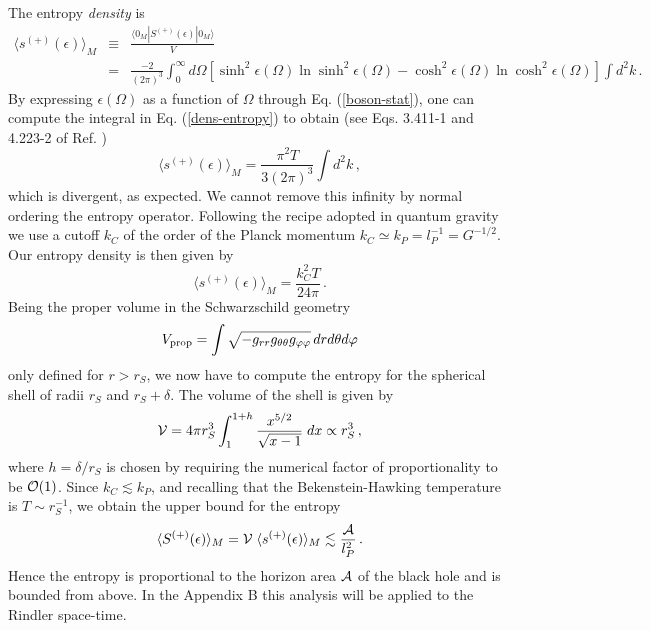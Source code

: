 \noindent The entropy {\it density} is
\begin{eqnarray}\label{dens-entropy}
\langle s^{(+)}(\epsilon)\rangle_M &\equiv&
 \frac{\langle 0_M|S^{(+)}(\epsilon)|0_M\rangle}{V} \\
 &=& \frac{-2}{(2\pi)^3}\int_0^{\infty}d \Omega \left[\sinh^2 \epsilon(\Omega)
\ln \sinh^2\epsilon(\Omega) - \cosh^2 \epsilon(\Omega)\ln
 \cosh^2\epsilon(\Omega)\right]\int d^2 k \,{.} \nonumber
 \end{eqnarray}
By expressing $\epsilon(\Omega)$ as a function of $\Omega$ through
Eq. (\ref{boson-stat}), one can compute the integral in  Eq.
(\ref{dens-entropy}) to obtain (see Eqs. 3.411-1 and 4.223-2 of
Ref. \cite{ryzhik})
\begin{equation}\label{dens-entr-int}
 \langle s^{(+)}(\epsilon)\rangle_M
 = \frac{\pi^2 T}{3(2\pi)^3}  \int d^2 k \,{,}
\end{equation}
which is divergent, as expected. We cannot remove this infinity by
normal ordering the entropy operator. Following the recipe adopted in 
quantum gravity we use a cutoff $k_C$ of the order of the Planck 
momentum $k_C \simeq k_P=l_P^{-1}=G^{-1/2}$. 
Our entropy density is then given by
\begin{equation}\label{dens-entr-cutoff}
 \langle s^{(+)}(\epsilon)\rangle_M
 = \frac{k^2_C T}{24 \pi}  \,{.}
\end{equation}
Being the proper volume in the Schwarzschild geometry
\[
V_{\rm prop} = \int \sqrt{-g_{rr}
g_{\theta\theta}g_{\varphi\varphi}}\, dr d\theta d\varphi
\]
only defined for $r > r_S$, we now have to compute the entropy for
the spherical shell of radii $r_S$ and $r_S + \delta$. The volume
of the shell is given by
\begin{equation}\label{vshell}
  {\cal V} = 4 \pi r_S^3 \int_1^{1 + h}\frac{x^{5/2}}{\sqrt{x-1}}
  \; dx \propto r_S^3  \,,
\end{equation}
where $h = \delta / r_S $ is chosen by requiring the numerical
factor of proportionality to be ${\cal O}(1)$. Since $k_C \lesssim
k_P$, and recalling that the Bekenstein-Hawking temperature is
$T\sim r_S^{-1}$, we obtain the upper bound for the entropy
\begin{equation}\label{entropy1}
 \langle S^{(+)}(\epsilon)\rangle_M = {\cal V} \; \langle s^{(+)}(\epsilon)\rangle_M
 \lesssim \frac{\cal A}{l_P^2} \,{.}
\end{equation}
Hence the entropy is proportional to the horizon area ${\cal A}$
of the black hole and is bounded from above. In the Appendix B
this analysis will be applied to the Rindler space-time.

